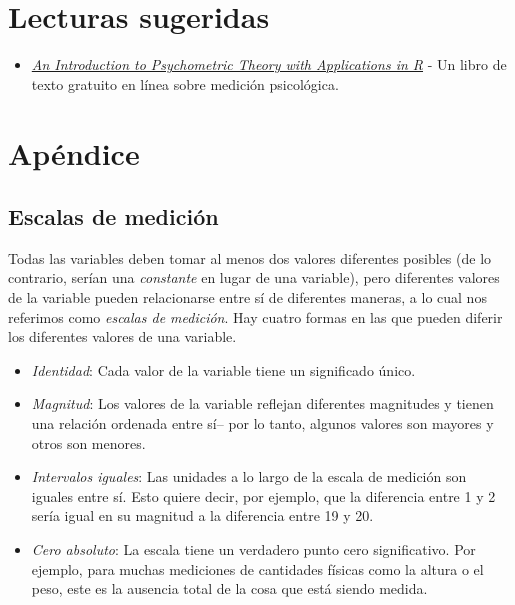 \documentclass[
  12pt,
]{book}
\providecommand{\tightlist}{%
  \setlength{\itemsep}{0pt}\setlength{\parskip}{0pt}}
\begin{document}
\hypertarget{lecturas-sugeridas}{%
\section{Lecturas sugeridas}\label{lecturas-sugeridas}}

\begin{itemize}
\tightlist
\item
  \href{http://www.personality-project.org/r/book/}{\emph{An Introduction to Psychometric Theory with Applications in R}} - Un libro de texto gratuito en línea sobre medición psicológica.
\end{itemize}

\hypertarget{apuxe9ndice}{%
\section{Apéndice}\label{apuxe9ndice}}

\hypertarget{escalas-de-mediciuxf3n}{%
\subsection{Escalas de medición}\label{escalas-de-mediciuxf3n}}

Todas las variables deben tomar al menos dos valores diferentes posibles (de lo contrario, serían una \emph{constante} en lugar de una variable), pero diferentes valores de la variable pueden relacionarse entre sí de diferentes maneras, a lo cual nos referimos como \emph{escalas de medición}. Hay cuatro formas en las que pueden diferir los diferentes valores de una variable.

\begin{itemize}
\tightlist
\item
  \emph{Identidad}: Cada valor de la variable tiene un significado único.
\item
  \emph{Magnitud}: Los valores de la variable reflejan diferentes magnitudes y tienen una relación ordenada entre sí-- por lo tanto, algunos valores son mayores y otros son menores.
\item
  \emph{Intervalos iguales}: Las unidades a lo largo de la escala de medición son iguales entre sí. Esto quiere decir, por ejemplo, que la diferencia entre 1 y 2 sería igual en su magnitud a la diferencia entre 19 y 20.
\item
  \emph{Cero absoluto}: La escala tiene un verdadero punto cero significativo. Por ejemplo, para muchas mediciones de cantidades físicas como la altura o el peso, este es la ausencia total de la cosa que está siendo medida.
\end{itemize}
\end{document}

